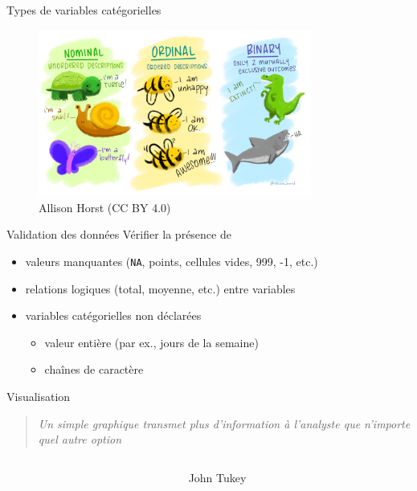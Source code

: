 \documentclass[
  ignorenonframetext,
]{beamer}
\providecommand{\tightlist}{%
  \setlength{\itemsep}{0pt}\setlength{\parskip}{0pt}}\usepackage{longtable,booktabs,array}
\begin{document}
\begin{frame}{Types de variables catégorielles}
\protect\hypertarget{types-de-variables-catuxe9gorielles}{}
\begin{figure}

{\centering \includegraphics[width=0.8\textwidth,height=\textheight]{figures/nominal_ordinal_binary.png}

}

\caption{Allison Horst (CC BY 4.0)}

\end{figure}
\end{frame}

\begin{frame}[fragile]{Validation des données}
\protect\hypertarget{validation-des-donnuxe9es}{}
Vérifier la présence de

\begin{itemize}
\tightlist
\item
  valeurs manquantes (\texttt{NA}, points, cellules vides, 999, -1,
  etc.)
\item
  relations logiques (total, moyenne, etc.) entre variables
\item
  variables catégorielles non déclarées

  \begin{itemize}
  \tightlist
  \item
    valeur entière (par ex., jours de la semaine)
  \item
    chaînes de caractère
  \end{itemize}
\end{itemize}
\end{frame}

\begin{frame}{Visualisation}
\protect\hypertarget{visualisation}{}
\begin{quote}
\emph{Un simple graphique transmet plus d'information à l'analyste que
n'importe quel autre option}
\end{quote}

\begin{columns}[T]
\begin{column}{0.8\textwidth}
\end{column}

\begin{column}{0.2\textwidth}
John Tukey
\end{column}
\end{columns}
\end{frame}
\end{document}
